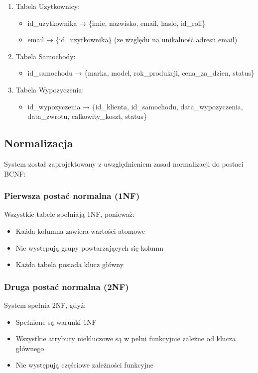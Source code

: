 \documentclass[12pt]{article}
\begin{document}
\begin{enumerate}
    \item Tabela Uzytkownicy:
    \begin{itemize}
        \item id\_uzytkownika → \{imie, nazwisko, email, haslo, id\_roli\}
        \item email → \{id\_uzytkownika\} (ze względu na unikalność adresu email)
    \end{itemize}

    \item Tabela Samochody:
    \begin{itemize}
        \item id\_samochodu → \{marka, model, rok\_produkcji, cena\_za\_dzien, status\}
    \end{itemize}

    \item Tabela Wypozyczenia:
    \begin{itemize}
        \item id\_wypozyczenia → \{id\_klienta, id\_samochodu, data\_wypozyczenia, data\_zwrotu, calkowity\_koszt, status\}
    \end{itemize}
\end{enumerate}

\subsection{Normalizacja}
System został zaprojektowany z uwzględnieniem zasad normalizacji do postaci BCNF:

\subsubsection{Pierwsza postać normalna (1NF)}
Wszystkie tabele spełniają 1NF, ponieważ:
\begin{itemize}
    \item Każda kolumna zawiera wartości atomowe
    \item Nie występują grupy powtarzających się kolumn
    \item Każda tabela posiada klucz główny
\end{itemize}

\subsubsection{Druga postać normalna (2NF)}
System spełnia 2NF, gdyż:
\begin{itemize}
    \item Spełnione są warunki 1NF
    \item Wszystkie atrybuty niekluczowe są w pełni funkcyjnie zależne od klucza głównego
    \item Nie występują częściowe zależności funkcyjne
\end{itemize}
\end{document}
